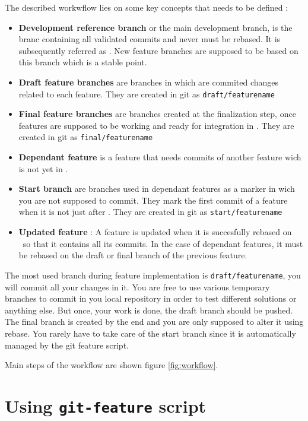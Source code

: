 The described workwflow lies on some key concepts that needs to be defined :
\begin{itemize}
 \item \textbf{Development reference branch} or the main development branch, is the branc containing all validated commits and never must be rebased. It is subsequently referred as \texttt{\DEVREF}. New feature branches are supposed to be based on this branch which is a stable point.
 \item \textbf{Draft feature branches} are branches in which are commited changes related to each feature. They are created in git as \texttt{draft/featurename} 
 \item \textbf{Final feature branches} are branches created at the finalization step, once features are supposed to be working and ready for integration in \DEVREF. They are created in git as \texttt{final/featurename}
 \item \textbf{Dependant feature} is a feature that needs commits of another feature wich is not yet in \DEVREF.
 \item \textbf{Start branch} are branches used in dependant features as a marker in wich you are not supposed to commit. They mark the first commit of a feature when it is not just after \DEVREF. They are created in git as \texttt{start/featurename}
 \item \textbf{Updated feature} : A feature is updated when it is succesfully rebased on \DEVREF~so that it contains all its commits. In the case of dependant features, it must be rebased on the draft or final branch of the previous feature.
\end{itemize}

The most used branch during feature implementation is \texttt{draft/featurename}, you will commit all your changes in it. You are free to use various temporary branches to commit in you local repository in order to test different solutions or anything else. But once, your work is done, the draft branch should be pushed. The final branch is created by the end and you are only supposed to alter it using rebase. You rarely have to take care of the start branch since it is automatically managed by the git feature script.


Main steps of the workflow are shown figure \ref{fig:workflow}.


\section{Using \texttt{git-feature} script}

